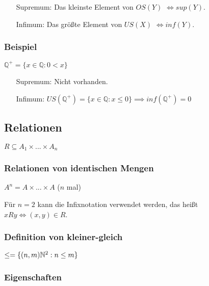\documentclass[12pt]{scrreprt}
\begin{document}
                \begin{itemize}
                    \item[Supremum:] Das kleinste Element von $ OS(Y) $ $ \iff sup(Y) $.
                    \item[Infimum:] Das größte Element von $ US(X) $ $ \iff inf(Y) $.
                \end{itemize}


                \subsubsection{Beispiel}
                    $ \mathbb{Q} ^ \mathsf{+} = \{ x \in \mathbb{Q} : 0 < x \} $

                    \begin{itemize}
                        \item[Supremum:] Nicht vorhanden.
                        \item[Infimum:] $ US(\mathbb{Q} ^ \mathsf{+}) = \{ x \in \mathbb{Q} : x \leq 0 \} \implies inf(\mathbb{Q} ^ \mathsf{+}) = 0 $
                    \end{itemize}


            \subsection{Relationen}
                \label{ss:grundbegriffe_mengen_relationen}

                $ R \subseteq A _ 1 \times ... \times A _ n $

                \subsubsection{Relationen von identischen Mengen}

                    $ A ^ n = A \times ... \times A $ ($ n $ mal)

                    Für $ n = 2 $ kann die Infixnotation verwendet werden, das heißt $ xRy \iff (x, y) \in R $.


                \subsubsection{Definition von kleiner-gleich}

                    $ \leq = \{ (n, m) \if \mathbb{N} ^ 2 : n \leq m \} $


                \subsubsection{Eigenschaften}
                    \label{sss:grundbegriffe_mengen_relationen_eigenschaften}
\end{document}
